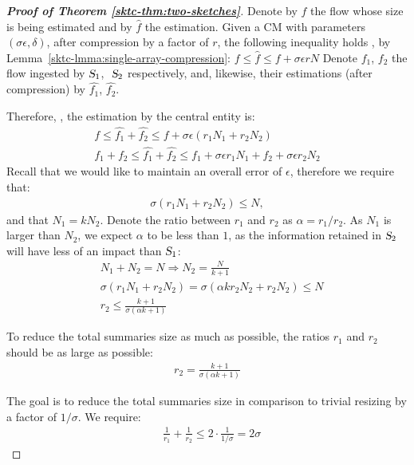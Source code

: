 \begin{proof}[\textbf{Proof of Theorem \ref{sktc-thm:two-sketches}}]
Denote by $f$ the flow whose size is being estimated and by $\hat{f}$ the estimation. Given a CM with parameters $(\sigma \epsilon, \delta)$, after compression by a factor of $r$, the following inequality holds , by Lemma~\ref{sktc-lmma:single-array-compression}:
$ f \leq \hat{f} \leq f + \sigma \epsilon r N$
\noindent Denote $f_1$, $f_2$ the flow ingested by $\textsl{S}_1$, $\textsl{ S}_2$ respectively, and, likewise, their estimations (after compression) by $\hat{f_1}$, $\hat{f_2}$.

Therefore, , the estimation by the central entity is:
\begin{align*}
    f \leq \hat{f_1} + \hat{f_2} \leq f + \sigma \epsilon (r_1 N_1 + r_2 N_2) \\
    f_1 + f_2 \leq \hat{f_1} + \hat{f_2} \leq f_1 + \sigma \epsilon r_1 N_1 + f_2 + \sigma \epsilon r_2 N_2
\end{align*}
\noindent Recall that we would like to maintain an overall error of $\epsilon$, therefore we require that:
\begin{align*}
    \sigma(r_1 N_1 + r_2 N_2) \leq N,
\end{align*}
\noindent and that $N_1 = k N_2$. Denote the ratio between $r_1$ and $r_2$ as $\alpha=r_1 / r_2$. As $N_1$ is larger than $N_2$, we expect $\alpha$ to be less than $1$, as the information retained in $\textsl{S}_2$ will have less of an impact than $\textsl{S}_1$:
\begin{align*}
   & N_1 + N_2 = N \Rightarrow  N_2 = \frac{N}{k+1} \\
    &\sigma(r_1 N_1 + r_2 N_2) = \sigma (\alpha k r_2 N_2 + r_2 N_2) \leq N \\
    &r_2 \leq \frac{k+1}{\sigma (\alpha k +1)}
\end{align*}

To reduce the total summaries size as much as possible, the ratios $r_1$ and $r_2$ should be as large as possible:
\begin{align}
    r_2 = \frac{k+1}{\sigma (\alpha k +1)}
    \label{sktc-eq:c2-size}
\end{align}

 The goal is to reduce the total summaries size in comparison to trivial resizing by a factor of $1/\sigma$. %
 We require:
\begin{align}
    &\frac{1}{r_1} + \frac{1}{r_2} \leq 2 \cdot \frac{1}{1 / \sigma} = 2\sigma \label{sktc-eq:size-constracint}
\end{align}


\end{proof}
